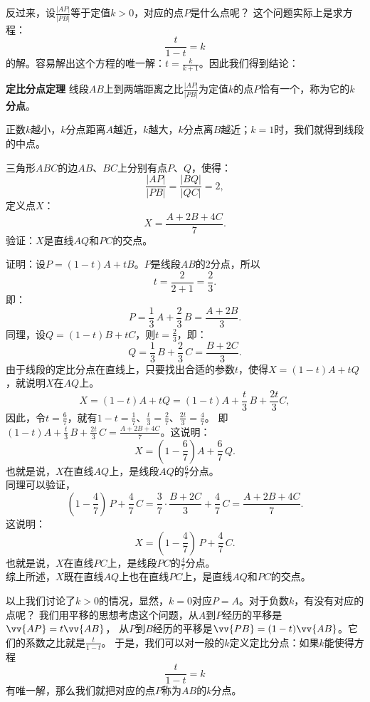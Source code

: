 \documentclass[12pt,UTF8]{ctexbook}
\begin{document}
反过来，设$ \frac{|AP|}{|PB|}$等于定值$k > 0$，对应的点$P$是什么点呢？
这个问题实际上是求方程：
$$ \frac{t}{1 - t} = k$$
的解。容易解出这个方程的唯一解：$t = \frac{k}{k+1}$。因此我们得到结论：
\begin{tm}{\textbf{定比分点定理} }\label{tm:0-0-10}
    线段$AB$上到两端距离之比$\frac{|AP|}{|PB|}$为定值$k$的点$P$恰有一个，称为它的$k$\textbf{分点}。
\end{tm}
正数$k$越小，$k$分点距离$A$越近，$k$越大，$k$分点离$B$越近；$k=1$时，我们就得到线段的中点。

\begin{et}\label{et:0-0-10}
    三角形$ABC$的边$AB$、$BC$上分别有点$P$、$Q$，使得：
    $$ \frac{|AP|}{|PB|} = \frac{|BQ|}{|QC|} = 2,$$
    定义点$X$：
    $$ X = \frac{A + 2B + 4C}{7}.$$
    验证：$X$是直线$AQ$和$PC$的交点。
\end{et}
\begin{so}
    证明：设$P = (1 - t)A + tB$。$P$是线段$AB$的$2$分点，所以
    $$ t = \frac{2}{2+1} = \frac23. $$
    即：
    $$ P = \frac13\, A + \frac23 \, B = \frac{A + 2B}{3}.$$
    同理，设$Q = (1 - t)B + tC$，则$t = \frac23$，即：
    $$ Q = \frac{1}{3} \, B + \frac{2}{3}\, C = \frac{B + 2C}{3}. $$
    由于线段的定比分点在直线上，只要找出合适的参数$t$，使得$X = (1 - t)A + tQ$，就说明$X$在$AQ$上。
    $$ X = (1 - t)A + tQ = (1 - t)A + \frac{t}{3}\,B + \frac{2t}{3}C,$$
    因此，令$t = \frac{6}{7}$，就有$1 - t = \frac{1}{7}$、$\frac{t}{3} = \frac27$、$\frac{2t}{3} = \frac{4}{7}$。
    即$(1 - t)A + \frac{t}{3} \, B + \frac{2t}{3} \, C = \frac{A + 2B + 4C}{7}$。这说明：
    $$ X = (1 - \frac{6}{7})A + \frac{6}{7} \, Q. $$
    也就是说，$X$在直线$AQ$上，是线段$AQ$的$\frac{6}{7}$分点。\\
    同理可以验证，
    $$ (1 - \frac{4}{7})\, P + \frac{4}{7}\, C = \frac{3}{7} \cdot \frac{B + 2C}{3} + \frac{4}{7} \, C = \frac{A + 2B + 4C}{7}. $$
    这说明：
    $$ X = (1 - \frac{4}{7}) \, P + \frac{4}{7} \, C. $$
    也就是说，$X$在直线$PC$上，是线段$PC$的$\frac{4}{7}$分点。\\
    综上所述，$X$既在直线$AQ$上也在直线$PC$上，是直线$AQ$和$PC$的交点。
\end{so}

以上我们讨论了$k>0$的情况，显然，$k=0$对应$P = A$。对于负数$k$，有没有对应的点呢？
我们用平移的思想考虑这个问题，从$A$到$P$经历的平移是$\vv{AP} = t\vv{AB}$，
从$P$到$B$经历的平移是$\vv{PB} = (1 - t)\vv{AB}$。它们的系数之比就是$ \frac{t}{1 - t}$。
于是，我们可以对一般的$k$定义定比分点：如果$k$能使得方程
$$ \frac{t}{1 - t} = k$$
有唯一解，那么我们就把对应的点$P$称为$AB$的$k$分点。
\end{document}
